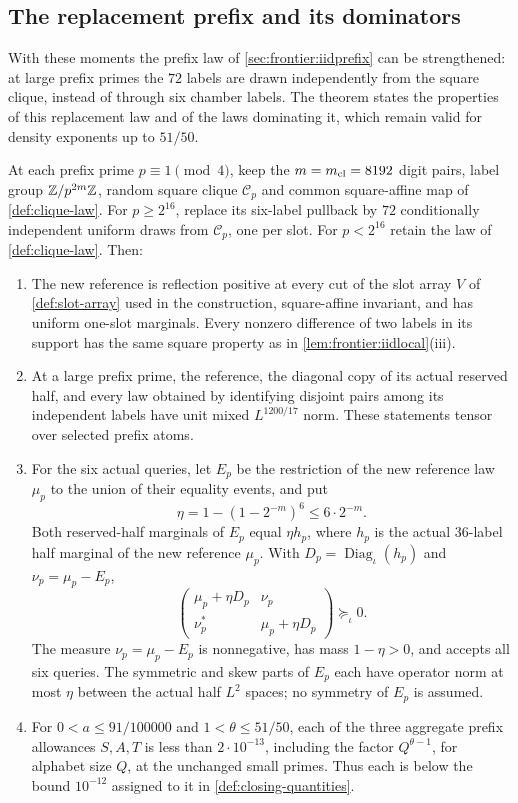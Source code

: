 \subsection{The replacement prefix and its dominators}

With these moments the prefix law of \cref{sec:frontier:iidprefix}
can be strengthened: at large prefix primes the $72$ labels are
drawn independently from the square clique, instead of through six
chamber labels. The theorem states the properties of this
replacement law and of the laws dominating it, which remain valid
for density exponents up to $51/50$.

\begin{theorem}
\label{thm:density:iid-prefix}
At each prefix prime $p\equiv1\pmod4$, keep the $m=m_{\mathrm{cl}}=8192$
digit pairs, label group $\mathbb Z/p^{2m}\mathbb Z$, random square clique $\mathcal C_p$
and common square-affine map of \cref{def:clique-law}. For $p\ge2^{16}$,
replace its six-label pullback by $72$ conditionally independent uniform
draws from $\mathcal C_p$, one per slot. For $p<2^{16}$ retain
the law of \cref{def:clique-law}. Then:
\begin{enumerate}[label=(\alph*)]
\item The new reference is reflection positive at every cut of the slot array $V$ of \cref{def:slot-array} used in the construction,
 square-affine invariant, and has uniform one-slot marginals. Every
 nonzero difference of two labels in its support has the same square
 property as in \cref{lem:frontier:iidlocal}(iii).
\item At a large prefix prime, the reference, the diagonal copy of its
 actual reserved half, and every law obtained by identifying disjoint
 pairs among its independent labels have unit mixed $L^{1200/17}$ norm.
 These statements tensor over selected prefix atoms.
\item For the six actual queries, let $E_p$ be the restriction of the new reference law $\mu_p$ to the union of their equality events, and put
 \[
  \eta=1-(1-2^{-m})^6\le6\cdot2^{-m}.
 \]
 Both reserved-half marginals of $E_p$ equal $\eta h_p$, where $h_p$ is
 the actual $36$-label half marginal of the new reference $\mu_p$.
 With $D_p=\operatorname{Diag}_\iota(h_p)$ and $\nu_p=\mu_p-E_p$,
 \[
 \begin{pmatrix}\mu_p+\eta D_p&\nu_p\\
                 \nu_p^*&\mu_p+\eta D_p\end{pmatrix}\succeq_\iota0.
 \]
 The measure $\nu_p=\mu_p-E_p$ is nonnegative, has mass $1-\eta>0$, and accepts all six
 queries. The symmetric and skew parts of $E_p$ each have operator norm at most $\eta$ between the actual half $L^2$ spaces; no symmetry of $E_p$ is assumed.
\item For $0<a\le91/100000$ and $1<\theta\le51/50$, each of the three
 aggregate prefix allowances $S,A,T$ is less than $2\cdot10^{-13}$,
 including the factor $Q^{\theta-1}$, for alphabet size $Q$, at the unchanged small primes. Thus each is below the bound $10^{-12}$ assigned to it in \cref{def:closing-quantities}.
\end{enumerate}
\end{theorem}

